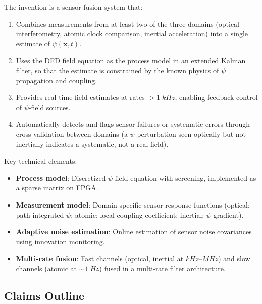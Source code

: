 \documentclass[11pt,a4paper]{article}
\begin{document}
The invention is a sensor fusion system that:

\begin{enumerate}[nosep]
\item Combines measurements from at least two of the three
domains (optical interferometry, atomic clock comparison,
inertial acceleration) into a single estimate of
$\psi(\mathbf{x},t)$.

\item Uses the DFD field equation as the process model in an
extended Kalman filter, so that the estimate is constrained
by the known physics of $\psi$ propagation and coupling.

\item Provides real-time field estimates at rates $> 1\;\si{kHz}$,
enabling feedback control of $\psi$-field sources.

\item Automatically detects and flags sensor failures or
systematic errors through cross-validation between domains
(a $\psi$ perturbation seen optically but not inertially
indicates a systematic, not a real field).
\end{enumerate}

Key technical elements:
\begin{itemize}[nosep]
\item \textbf{Process model}: Discretized $\psi$ field equation
with screening, implemented as a sparse matrix on FPGA.
\item \textbf{Measurement model}: Domain-specific sensor response
functions (optical: path-integrated $\psi$; atomic: local
coupling coefficient; inertial: $\psi$ gradient).
\item \textbf{Adaptive noise estimation}: Online estimation of
sensor noise covariances using innovation monitoring.
\item \textbf{Multi-rate fusion}: Fast channels (optical,
inertial at $\si{kHz}$--$\si{MHz}$) and slow channels
(atomic at $\sim 1\;\si{Hz}$) fused in a multi-rate filter
architecture.
\end{itemize}

\subsection{Claims Outline}
\end{document}
